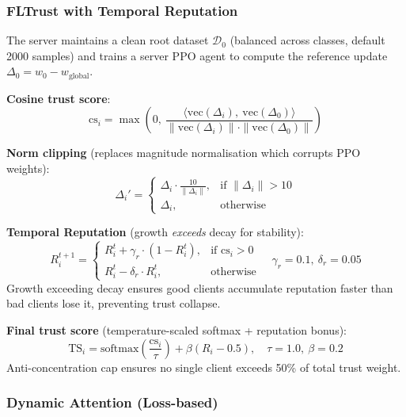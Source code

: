 \documentclass[conference]{IEEEtran}
\begin{document}
\subsubsection{FLTrust with Temporal Reputation}

The server maintains a clean root dataset $\mathcal{D}_0$ (balanced across classes, default 2000 samples) and trains a server PPO agent to compute the reference update $\Delta_0 = w_0 - w_{\mathrm{global}}$.

\textbf{Cosine trust score}:
\begin{equation}
\mathrm{cs}_i = \max\!\left(0,\ \frac{\langle \mathrm{vec}(\Delta_i),\ \mathrm{vec}(\Delta_0) \rangle}{\|\mathrm{vec}(\Delta_i)\| \cdot \|\mathrm{vec}(\Delta_0)\|}\right)
\end{equation}

\textbf{Norm clipping} (replaces magnitude normalisation which corrupts PPO weights):
\begin{equation}
\Delta_i' = \begin{cases}
\Delta_i \cdot \frac{10}{\|\Delta_i\|}, & \text{if } \|\Delta_i\| > 10 \\
\Delta_i, & \text{otherwise}
\end{cases}
\end{equation}

\textbf{Temporal Reputation} (growth \emph{exceeds} decay for stability):
\begin{equation}
R_i^{t+1} = \begin{cases}
R_i^t + \gamma_r \cdot (1 - R_i^t), & \text{if } \mathrm{cs}_i > 0 \\
R_i^t - \delta_r \cdot R_i^t, & \text{otherwise}
\end{cases}
\quad \gamma_r = 0.1,\ \delta_r = 0.05
\end{equation}
Growth exceeding decay ensures good clients accumulate reputation faster than bad clients lose it, preventing trust collapse.

\textbf{Final trust score} (temperature-scaled softmax + reputation bonus):
\begin{equation}
\mathrm{TS}_i = \mathrm{softmax}\!\left(\frac{\mathrm{cs}_i}{\tau}\right) + \beta(R_i - 0.5), \quad \tau = 1.0,\ \beta = 0.2
\end{equation}
Anti-concentration cap ensures no single client exceeds 50\% of total trust weight.

\subsubsection{Dynamic Attention (Loss-based)}
\end{document}

